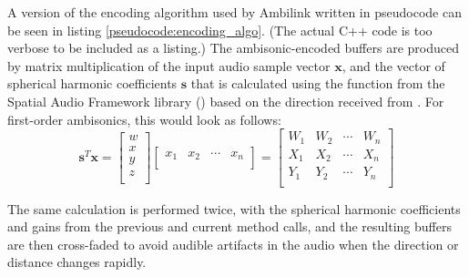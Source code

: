 A version of the encoding algorithm used by Ambilink written in pseudocode can be seen in listing \ref{pseudocode:encoding_algo}.
(The actual C++ code is too verbose to be included as a listing.) 
The ambisonic-encoded buffers are produced by matrix multiplication of the input audio sample vector $\bm{x}$, and 
the vector of spherical harmonic coefficients $\bm{s}$ that is 
calculated using the  function from the Spatial Audio Framework library (\cite{saf_repo}) based on the 
direction received from . For first-order ambisonics, this would look as follows:
\begin{equation}
    \bm{s}^T\bm{x} = 
    \begin{bmatrix} w\\ x\\  y\\ z\\ \end{bmatrix}
    \begin{bmatrix} x_1& x_2 & \cdots &x_n\\ \end{bmatrix} =
    \begin{bmatrix}
        W_{1}  & W_{2}  & \cdots & W_{n} \\
        X_{1}  & X_{2}  & \cdots & X_{n} \\
        Y_{1}  & Y_{2}  & \cdots & Y_{n} \\
    \end{bmatrix}
\end{equation}

The same calculation is performed twice, with the spherical harmonic coefficients and gains from the previous and current method calls,
and the resulting buffers are then cross-faded to avoid audible artifacts in the audio when the direction or distance changes rapidly.

